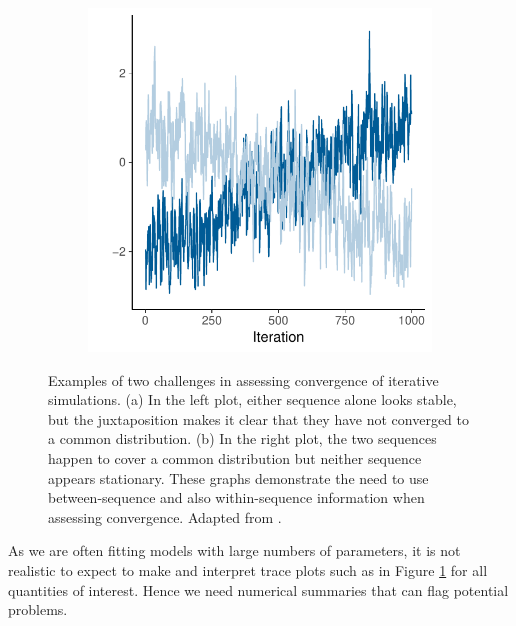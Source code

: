 \documentclass[american,]{article}
\theoremstyle{definition}
\begin{document}
\begin{figure}
\begin{subfigure}[b]{0.37\textwidth}
    \includegraphics[width=\textwidth]{graphics/convergechallenge2.pdf}
\end{subfigure}
\caption{Examples of two challenges in assessing convergence of iterative
simulations. (a) In the left plot, either sequence alone looks stable, but the
juxtaposition makes it clear that they have not converged to a common
distribution. (b) In the right plot, the two sequences happen to cover a common
distribution but neither sequence appears stationary. These graphs demonstrate
the need to use between-sequence and also within-sequence information when
assessing convergence. Adapted from \citet{BDA3}.}
\label{converge.challenge}
\end{figure}

As we are often fitting models with large
numbers of parameters, it is not realistic to expect to make and interpret
trace plots such as in Figure \ref{converge.challenge} for all
quantities of interest. Hence we need numerical summaries that can flag
potential problems. 
\end{document}
